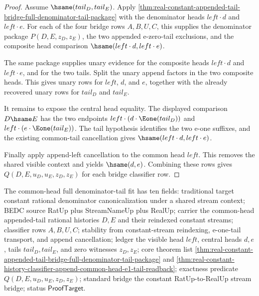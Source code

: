 \begin{proof}
Assume $\hsame(tail_D,tail_E)$. Apply
\autoref{thm:real-constant-appended-tail-bridge-full-denominator-tail-package}
with the denominator heads $left\cdot d$ and $left\cdot e$. For each of the
four bridge rows $A,B,U,C$, this supplies the denominator package
$P(D,E,z_D,z_E)$, the two appended e-zero-tail exclusions, and the composite
head comparison $\hsame(left\cdot d,left\cdot e)$.

The same package supplies unary evidence for the composite heads
$left\cdot d$ and $left\cdot e$, and for the two tails. Split the unary append
factors in the two composite heads. This gives unary rows for $left$, $d$, and
$e$, together with the already recovered unary rows for $tail_D$ and $tail_E$.

It remains to expose the central head equality. The displayed comparison
$D\hsame E$ has the two endpoints
$left\cdot(d\cdot\Eone(tail_D))$ and
$left\cdot(e\cdot\Eone(tail_E))$. The tail hypothesis identifies the two
e-one suffixes, and the existing common-tail cancellation gives
$\hsame(left\cdot d,left\cdot e)$.

Finally apply append-left cancellation to the common head $left$. This removes
the shared visible context and yields $\hsame(d,e)$. Combining these rows gives
$Q(D,E,u_D,u_E,z_D,z_E)$ for each bridge classifier row.
\end{proof}

The common-head full denominator-tail fit has ten fields: traditional target
constant rational denominator canonicalization under a shared stream context;
BEDC source RatUp plus StreamNameUp plus RealUp; carrier the common-head
appended-tail rational histories $D,E$ and their reindexed constant streams;
classifier rows $A,B,U,C$; stability from constant-stream reindexing,
e-one-tail transport, and append cancellation; ledger the visible head $left$,
central heads $d,e$, tails $tail_D,tail_E$, and zero witnesses $z_D,z_E$; core
theorem list
\autoref{thm:real-constant-appended-tail-bridge-full-denominator-tail-package}
and
\autoref{thm:real-constant-history-classifier-append-common-head-e1-tail-readback};
exactness predicate $Q(D,E,u_D,u_E,z_D,z_E)$; standard bridge the constant
RatUp-to-RealUp stream bridge; status $\mathsf{ProofTarget}$.


